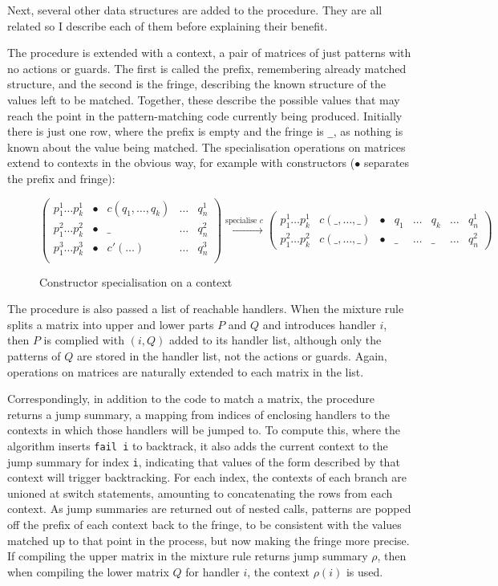 Next, several other data structures are added to the procedure. They are all related so I describe each of them before explaining their benefit. 

The procedure is extended with a context, a pair of matrices of just patterns with no actions or guards. The first is called the prefix, remembering already matched structure, and the second is the fringe, describing the known structure of the values left to be matched. Together, these describe the possible values that may reach the point in the pattern-matching code currently being produced. Initially there is just one row, where the prefix is empty and the fringe is \verb|_|, as nothing is known about the value being matched. The specialisation operations on matrices extend to contexts in the obvious way, for example with constructors ($\bullet$ separates the prefix and fringe):

\begin{figure}[H]
$
\begin{pmatrix}
 p^1_1 \dots  p^1_k & \bullet & c(q_1, \dots, q_k) & \dots & q^1_n \\
 p^2_1 \dots  p^2_k & \bullet & \_ & \dots & q^2_n \\
 p^3_1 \dots  p^3_k &\bullet & c'(\dots)  & \dots & q^3_n  \\
\end{pmatrix}
\xrightarrow{\text{specialise } c}
\begin{pmatrix}
p^1_1 \dots  p^1_k  & c(\_, \dots, \_) & \bullet &  q_1 & \dots & q_k & \dots &  q^1_n \\
 p^2_1 \dots  p^2_k & c(\_, \dots, \_) & \bullet & \_ & \dots & \_ & \dots & q^2_n
\end{pmatrix}
$
\caption{Constructor specialisation on a context}
\end{figure}

The procedure is also passed a list of reachable handlers. When the mixture rule splits a matrix into upper and lower parts $P$ and $Q$ and introduces handler $i$, then $P$ is complied with $(i, Q)$ added to its handler list, although only the patterns of $Q$ are stored in the handler list, not the actions or guards. Again, operations on matrices are naturally extended to each matrix in the list. 

Correspondingly, in addition to the code to match a matrix, the procedure returns a jump summary, a mapping from indices of enclosing handlers to the contexts in which those handlers will be jumped to. To compute this, where the algorithm inserts \verb|fail i| to backtrack, it also adds the current context to the jump summary for index \verb|i|, indicating that values of the form described by that context will trigger backtracking. For each index, the contexts of each branch are unioned at switch statements, amounting to concatenating the rows from each context. As jump summaries are returned out of nested calls, patterns are popped off the prefix of each context back to the fringe, to be consistent with the values matched up to that point in the process, but now making the fringe more precise. 
If compiling the upper matrix in the mixture rule returns jump summary $\rho$, then when compiling the lower matrix $Q$ for handler $i$, the context $\rho(i)$ is used.%



